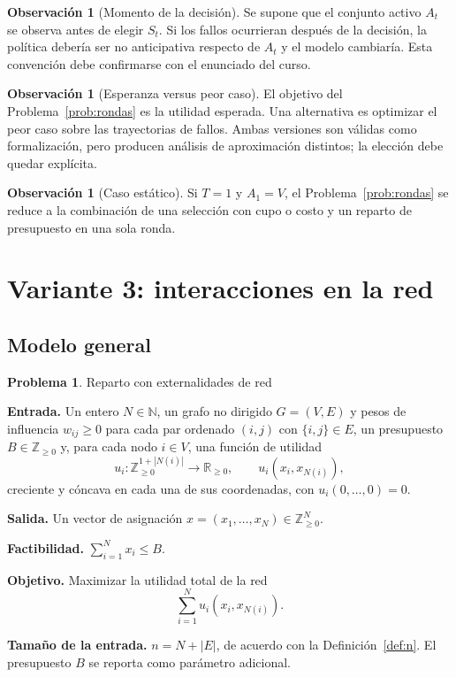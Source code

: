 \documentclass[11pt,a4paper]{article}
\theoremstyle{definition}
\newtheorem{problema}[definicion]{Problema}
\newtheorem{observacion}[definicion]{Observación}
\theoremstyle{plain}
\newcommand{\N}{\mathbb{N}}
\newcommand{\Z}{\mathbb{Z}}
\newcommand{\R}{\mathbb{R}}
\begin{document}
\begin{observacion}[Momento de la decisión]
Se supone que el conjunto activo $A_t$ se observa antes de elegir $S_t$. Si los
fallos ocurrieran después de la decisión, la política debería ser no
anticipativa respecto de $A_t$ y el modelo cambiaría. Esta convención debe
confirmarse con el enunciado del curso.
\end{observacion}

\begin{observacion}[Esperanza versus peor caso]
El objetivo del Problema~\ref{prob:rondas} es la utilidad esperada. Una
alternativa es optimizar el peor caso sobre las trayectorias de fallos. Ambas
versiones son válidas como formalización, pero producen análisis de
aproximación distintos; la elección debe quedar explícita.
\end{observacion}

\begin{observacion}[Caso estático]
Si $T=1$ y $A_1=V$, el Problema~\ref{prob:rondas} se reduce a la combinación
de una selección con cupo o costo y un reparto de presupuesto en una sola
ronda.
\end{observacion}

\section{Variante 3: interacciones en la red}

\subsection{Modelo general}

\begin{problema}\label{prob:red} Reparto con externalidades de red

\textbf{Entrada.} Un entero $N\in\N$, un grafo no dirigido $G=(V,E)$ y pesos de
influencia $w_{ij}\ge0$ para cada par ordenado $(i,j)$ con $\{i,j\}\in E$, un
presupuesto $B\in\Z_{\ge0}$ y, para cada nodo $i\in V$, una función de utilidad
\[
  u_i:\Z_{\ge0}^{1+|N(i)|}\to\R_{\ge0},
  \qquad
  u_i(x_i,x_{N(i)}),
\]
creciente y cóncava en cada una de sus coordenadas, con $u_i(0,\dots,0)=0$.

\textbf{Salida.} Un vector de asignación
$x=(x_1,\dots,x_N)\in\Z_{\ge0}^N$.

\textbf{Factibilidad.} $\sum_{i=1}^{N} x_i\le B$.

\textbf{Objetivo.} Maximizar la utilidad total de la red
\[
  \sum_{i=1}^{N} u_i(x_i,x_{N(i)}).
\]

\textbf{Tamaño de la entrada.} $n=N+|E|$, de acuerdo con la
Definición~\ref{def:n}. El presupuesto $B$ se reporta como parámetro adicional.
\end{problema}
\end{document}
